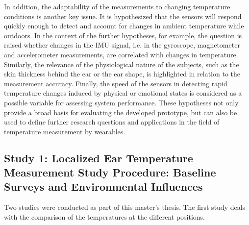 In addition, the adaptability of the measurements to changing temperature conditions is another key issue. 
It is hypothesized that the sensors will respond quickly enough to detect and account for changes in ambient temperature while outdoors.
In the context of the further hypotheses, for example, the question is raised whether changes in the IMU signal, i.e. in the gyroscope, magnetometer and accelerometer measurements, are correlated with changes in temperature. Similarly, the relevance of the physiological nature of the subjects, such as the skin thickness behind the ear or the ear shape, is highlighted in relation to the measurement accuracy. 
Finally, the speed of the sensors in detecting rapid temperature changes induced by physical or emotional states is considered as a possible variable for assessing system performance.
These hypotheses not only provide a broad basis for evaluating the developed prototype, but can also be used to define further research questions and applications in the field of temperature measurement by wearables.

\subsection{Study 1: Localized Ear Temperature Measurement Study Procedure: Baseline Surveys and Environmental Influences}
\label{ch:Design:Study:Study1}

Two studies were conducted as part of this master's thesis. 
The first study deals with the comparison of the temperatures at the different positions.


